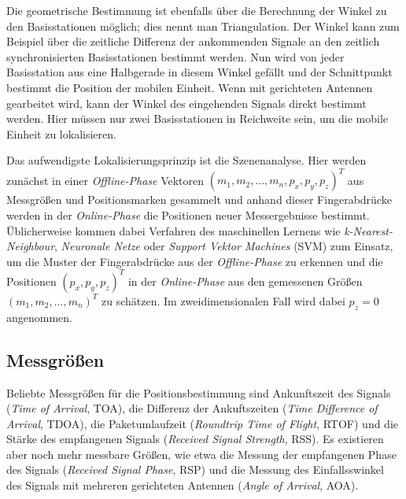 Die geometrische Bestimmung ist ebenfalls über die Berechnung der Winkel zu den Basisstationen möglich; dies nennt man Triangulation. Der Winkel kann zum Beispiel über die zeitliche Differenz der ankommenden Signale an den zeitlich synchronisierten Basisstationen bestimmt werden.
Nun wird von jeder Basisstation aus eine Halbgerade in diesem Winkel gefällt und der Schnittpunkt bestimmt die Position der mobilen Einheit.
Wenn mit gerichteten Antennen gearbeitet wird, kann der Winkel des eingehenden Signals direkt bestimmt werden.
Hier müssen nur zwei Basisstationen in Reichweite sein, um die mobile Einheit zu lokalisieren.

Das aufwendigste Lokalisierungsprinzip ist die Szenenanalyse. Hier werden zunächst in einer \emph{Offline-Phase} Vektoren $(m_1,m_2,...,m_n,p_x,p_y,p_z)^T$ aus Messgrößen und Positionsmarken gesammelt und anhand dieser Fingerabdrücke werden in der \emph{Online-Phase} die Positionen neuer Messergebnisse bestimmt. Üblicherweise kommen dabei Verfahren des maschinellen Lernens wie \emph{k-Nearest-Neighbour}, \emph{Neuronale Netze} oder \emph{Support Vektor Machines} (SVM) zum Einsatz, um die Muster der Fingerabdrücke aus der \emph{Offline-Phase} zu erkennen und die Positionen $(p_x,p_y,p_z)^T$ in der \emph{Online-Phase} aus den gemessenen Größen $(m_1,m_2,...,m_n)^T$ zu schätzen. Im zweidimensionalen Fall wird dabei $p_z = 0$ angenommen.

\subsection{Messgrößen}
Beliebte Messgrößen für die Positionsbestimmung sind Ankunftszeit des Signals (\emph{Time of Arrival}, TOA), die Differenz der Ankuftszeiten (\emph{Time Difference of Arrival}, TDOA), die Paketumlaufzeit (\emph{Roundtrip Time of Flight}, RTOF) und die Stärke des empfangenen Signals (\emph{Received Signal Strength}, RSS). Es existieren aber noch mehr messbare Größen, wie etwa die Messung der empfangenen Phase des Signals (\emph{Received Signal Phase}, RSP) und die Messung des Einfallsswinkel des Signals mit mehreren gerichteten Antennen (\emph{Angle of Arrival}, AOA).

